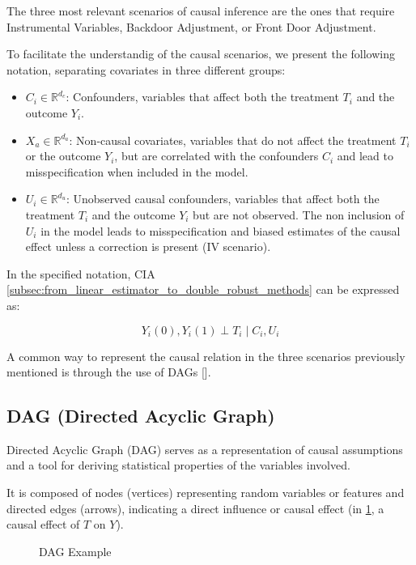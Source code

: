 \documentclass{article}
\numberwithin{equation}{section}
\begin{document}
The three most relevant scenarios of causal inference are the ones that require Instrumental Variables, Backdoor Adjustment, or Front Door Adjustment.

To facilitate the understandig of the causal scenarios, we present the following notation, separating covariates in three different groups:
\begin{itemize}
    \item $C_i \in \mathbb{R}^{d_c}$: Confounders, variables that affect both the treatment $T_i$ and the outcome $Y_i$.
    \item $X_a \in \mathbb{R}^{d_a}$: Non-causal covariates, variables that do not affect the treatment $T_i$ or the outcome $Y_i$, but are correlated with the confounders $C_i$ and lead to misspecification when included in the model.
    \item $U_i \in \mathbb{R}^{d_u}$: Unobserved causal confounders, variables that affect both the treatment $T_i$ and the outcome $Y_i$ but are not observed. The non inclusion of $U_i$ in the model leads to misspecification and biased estimates of the causal effect unless a correction is present (IV scenario).
\end{itemize}

In the specified notation, CIA \eqref{subsec:from_linear_estimator_to_double_robust_methods} can be expressed as:

\begin{equation}
    Y_i(0), Y_i(1) \perp T_i \mid C_i, U_i
\end{equation}

A common way to represent the causal relation in the three scenarios previously mentioned is through the use of DAGs [\cite{Pearl1995}].

\subsection{DAG (Directed Acyclic Graph)}

Directed Acyclic Graph (DAG) serves as a representation of causal assumptions and a tool for deriving statistical properties of the variables involved.

It is composed of nodes (vertices) representing random variables or features and directed edges (arrows), indicating a direct influence or causal effect (in \ref{fig:dag_example}, a causal effect of $T$ on $Y$).

\begin{figure}[H]
    \centering
    \caption{DAG Example}
    \label{fig:dag_example}
\end{figure}
\end{document}
